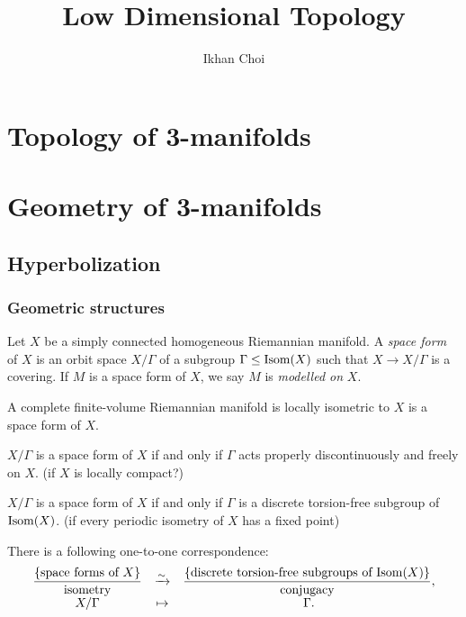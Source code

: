 \documentclass{../../large}
\begin{document}
\title{Low Dimensional Topology}
\author{Ikhan Choi}
\maketitle
\tableofcontents

\part{Topology of 3-manifolds}
\chapter{}
\chapter{}
\chapter{}


\part{Geometry of 3-manifolds}
\chapter{Hyperbolization}
\section{Geometric structures}




\begin{prb}
Let $X$ be a simply connected homogeneous Riemannian manifold.
A \emph{space form} of $X$ is an orbit space $X/\Gamma$ of a subgroup $\Gamma\le\operatorname{Isom}(X)$ such that $X\to X/\Gamma$ is a covering.
If $M$ is a space form of $X$, we say $M$ is \emph{modelled on} $X$.
\begin{parts}
\item A complete finite-volume Riemannian manifold is locally isometric to $X$ is a space form of $X$.
\item $X/\Gamma$ is a space form of $X$ if and only if $\Gamma$ acts properly discontinuously and freely on $X$. (if $X$ is locally compact?)
\item $X/\Gamma$ is a space form of $X$ if and only if $\Gamma$ is a discrete torsion-free subgroup of $\operatorname{Isom}(X)$. (if every periodic isometry of $X$ has a fixed point)
\item There is a following one-to-one correspondence:
\[\begin{array}{ccc}
\dfrac{\{\text{space forms of $X$}\}}{\text{isometry}}
&\xrightarrow{\sim}&
\dfrac{\{\text{discrete torsion-free subgroups of $\operatorname{Isom}(X)$}\}}{\text{conjugacy}},\\
X/\Gamma&\mapsto&\Gamma.
\end{array}\]
\end{parts}
\end{prb}
\begin{pf}

\end{pf}
\end{document}
